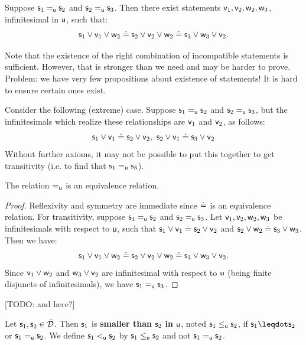 \documentclass[10pt, onecolumn, nofootinbib]{revtex4-2}
\begin{document}
\begin{prop}
	Suppose $\stmt_1\equ\stmt_2$ and $\stmt_2\equ\stmt_3$. Then there exist statements  $\stmt[v]_1,\stmt[v]_2,\stmt[w]_2,\stmt[w]_3$, infinitesimal in $\stmt[u]$, such that:
	$$
	\stmt_1\OR\stmt[v]_1\OR\stmt[w]_2 \eqgran \stmt_2\OR\stmt[v]_2\OR\stmt[w]_2 \eqgran \stmt_3\OR\stmt[w]_3\OR\stmt[v]_2.
	$$
\end{prop}

Note that the existence of the right combination of incompatible statements is sufficient. However, that is stronger than we need and may be harder to prove. Problem: we have very few propositions about existence of statements! It is hard to ensure certain ones exist. 

Consider the following (extreme) case. Suppose $\stmt_1\equ\stmt_2$ and $\stmt_2\equ\stmt_3$, but the infinitesimals which realize these relationships are $\stmt[v]_1$ and $\stmt[v]_2$, as follows:
$$
\stmt_1\OR\stmt[v]_1 \eqgran \stmt_2\OR\stmt[v]_2,\ \stmt_2\OR\stmt[v]_1\eqgran\stmt_3\OR\stmt[v]_2
$$
Without further axioms, it may not be possible to put this together to get transitivity (i.e. to find that $\stmt_1\equ\stmt_3$). 


\begin{prop}
	The relation $\equ$ is an equivalence relation.
\end{prop}
\begin{proof}
	Reflexivity and symmetry are immediate since $\eqgran$ is an equivalence relation. For transitivity, suppose $\stmt_1\equ\stmt_2$ and $\stmt_2\equ\stmt_3$. Let $\stmt[v]_1,\stmt[v]_2,\stmt[w]_2,\stmt[w]_3$ be infinitesimals with respect to $\stmt[u]$, such that $\stmt_1\OR\stmt[v]_1\eqgran\stmt_2\OR\stmt[v]_2$ and $\stmt_2\OR\stmt[w]_2\eqgran\stmt_3\OR\stmt[w]_3$. Then we have:
	$$
	\stmt_1\OR\stmt[v]_1\OR\stmt[w]_2 \eqgran \stmt_2\OR\stmt[v]_2\OR\stmt[w]_2 \eqgran \stmt_3\OR\stmt[w]_3\OR\stmt[v]_2.
	$$
	Since $\stmt[v]_1\OR\stmt[w]_2$ and $\stmt[w]_3\OR\stmt[v]_2$ are infinitesimal with respect to $\stmt[u]$ (being finite disjuncts of infinitesimals), we have $\stmt_1\equ\stmt_3$. 
\end{proof}

[TODO: and here?]

\begin{defn}\label{smalleru}
	Let $\stmt_1, \stmt_2 \in \tdomain$. Then $\stmt_1$ is \textbf{smaller than} $\stmt_2$ \textbf{in} $\stmt[u]$, noted $\stmt_1 \lequ \stmt_2$, if $\stmt_1 \finer \stmt_2$ or $\stmt_1 \equ \stmt_2$. We define $\stmt_1\leu\stmt_2$ by $\stmt_1\lequ\stmt_2$ and not $\stmt_1\equ\stmt_2$. 
\end{defn}
\end{document}
